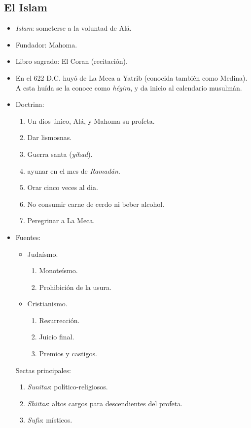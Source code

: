 \subsection{El Islam}

\begin{itemize}

\item \emph{Islam}: someterse a la voluntad de Alá.

\item Fundador: Mahoma.

\item Libro sagrado: El Coran (recitación).

\item En el 622 D.C. huyó de La Meca a Yatrib (conocida también como Medina). A esta huída se la conoce como \emph{hégira}, y da inicio al calendario musulmán.

\item Doctrina:
\begin{enumerate}
	\item Un dios único, Alá, y Mahoma su profeta.
	\item Dar lismosnas.
	\item Guerra santa (\emph{yihad}).
	\item ayunar en el mes de \emph{Ramadán}.
	\item Orar cinco veces al dia.
	\item No consumir carne de cerdo ni beber alcohol.
	\item Peregrinar a La Meca.
\end{enumerate}

\item Fuentes:
\begin{itemize}
	\item Judaísmo.
	\begin{enumerate}
	\item Monoteísmo.
	\item Prohibición de la usura.
	\end{enumerate}
	\item Cristianismo.
	\begin{enumerate}
		\item Resurrección.
		\item Juicio final.
		\item Premios y castigos.
	\end{enumerate}
\end{itemize}

Sectas principales:
\begin{enumerate}
	\item \emph{Sunitas}: político-religiosos.
	\item \emph{Shiitas}: altos cargos para descendientes del profeta.
	\item \emph{Sufis}: místicos.
\end{enumerate}


\end{itemize}
